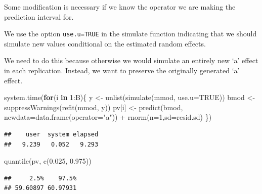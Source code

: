 \documentclass[
  ignorenonframetext,
]{beamer}
\newenvironment{Shaded}{\begin{snugshade}}{\end{snugshade}}
\newcommand{\AttributeTok}[1]{\textcolor[rgb]{0.77,0.63,0.00}{#1}}
\newcommand{\ConstantTok}[1]{\textcolor[rgb]{0.00,0.00,0.00}{#1}}
\newcommand{\ControlFlowTok}[1]{\textcolor[rgb]{0.13,0.29,0.53}{\textbf{#1}}}
\newcommand{\DecValTok}[1]{\textcolor[rgb]{0.00,0.00,0.81}{#1}}
\newcommand{\FloatTok}[1]{\textcolor[rgb]{0.00,0.00,0.81}{#1}}
\newcommand{\FunctionTok}[1]{\textcolor[rgb]{0.00,0.00,0.00}{#1}}
\newcommand{\NormalTok}[1]{#1}
\newcommand{\OtherTok}[1]{\textcolor[rgb]{0.56,0.35,0.01}{#1}}
\newcommand{\SpecialCharTok}[1]{\textcolor[rgb]{0.00,0.00,0.00}{#1}}
\newcommand{\StringTok}[1]{\textcolor[rgb]{0.31,0.60,0.02}{#1}}
\begin{document}
\begin{frame}[fragile]{}
\protect\hypertarget{section-14}{}
Some modification is necessary if we know the operator we are making the
prediction interval for.

We use the option \texttt{use.u=TRUE} in the simulate function
indicating that we should simulate new values conditional on the
estimated random effects.

We need to do this because otherwise we would simulate an entirely new
`a' effect in each replication. Instead, we want to preserve the
originally generated `a' effect.

\vspace{12pt}
\tiny

\begin{Shaded}
\begin{Highlighting}[]
\FunctionTok{system.time}\NormalTok{(}\ControlFlowTok{for}\NormalTok{(i }\ControlFlowTok{in} \DecValTok{1}\SpecialCharTok{:}\NormalTok{B)\{}
\NormalTok{ y }\OtherTok{\textless{}{-}} \FunctionTok{unlist}\NormalTok{(}\FunctionTok{simulate}\NormalTok{(mmod, }\AttributeTok{use.u=}\ConstantTok{TRUE}\NormalTok{))}
\NormalTok{  bmod }\OtherTok{\textless{}{-}} \FunctionTok{suppressWarnings}\NormalTok{(}\FunctionTok{refit}\NormalTok{(mmod, y))}
\NormalTok{  pv[i] }\OtherTok{\textless{}{-}} \FunctionTok{predict}\NormalTok{(bmod, }\AttributeTok{newdata=}\FunctionTok{data.frame}\NormalTok{(}\AttributeTok{operator=}\StringTok{"a"}\NormalTok{)) }\SpecialCharTok{+} 
    \FunctionTok{rnorm}\NormalTok{(}\AttributeTok{n=}\DecValTok{1}\NormalTok{,}\AttributeTok{sd=}\NormalTok{resid.sd)}
\NormalTok{\})}
\end{Highlighting}
\end{Shaded}

\begin{verbatim}
##    user  system elapsed 
##   9.239   0.052   9.293
\end{verbatim}

\begin{Shaded}
\begin{Highlighting}[]
\FunctionTok{quantile}\NormalTok{(pv, }\FunctionTok{c}\NormalTok{(}\FloatTok{0.025}\NormalTok{, }\FloatTok{0.975}\NormalTok{))}
\end{Highlighting}
\end{Shaded}

\begin{verbatim}
##     2.5%    97.5% 
## 59.60897 60.97931
\end{verbatim}
\end{frame}
\end{document}
